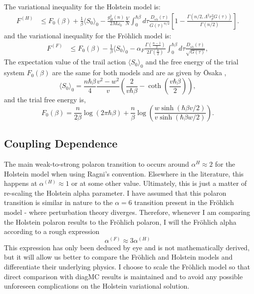 The variational inequality for the Holstein model is:
\begin{equation}
    \begin{aligned}
        F^{(H)} &\leq F_0(\beta) + \frac{1}{\beta} \langle S_0 \rangle_0 - \frac{g_H^2(n)}{2M\omega_0} \frac{V}{N} \int_0^{\hbar\beta} d\tau \frac{D_{\omega_0}(\tau)}{G(\tau)^{n/2}} \left[1 - \frac{\Gamma(n/2, \Lambda^2 r_p^2 G(\tau))}{\Gamma(n/2)}\right].
    \end{aligned}
\end{equation}
and the variational inequality for the Fr\"ohlich model is:
\begin{equation}
    \begin{aligned}
        F^{(F)} &\leq F_0(\beta) -\frac{1}{\beta} \langle S_0 \rangle_0 - \alpha_F \frac{\Gamma\left(\frac{n-1}{2}\right)}{2 \Gamma(\frac{n}{2})} \int_0^{\hbar\beta} d\tau \frac{D_{\omega_0}(\tau)}{\sqrt{G(\tau)}} ,
    \end{aligned}
\end{equation}
The expectation value of the trail action $\langle S_0 \rangle_0$ and the free energy of the trial system $F_0(\beta) $ are the same for both models and are as given by \=Osaka \cite{Osaka1959},
\begin{equation}
    \langle S_0 \rangle_0 = \frac{n\hbar\beta}{4} \frac{v^2-w^2}{v} \left(\frac{2}{v\hbar\beta} - \coth\left(\frac{v\hbar\beta}{2}\right)\right),
\end{equation}
and the trial free energy is,
\begin{equation}
    F_0(\beta) = \frac{n}{2\beta} \log\left(2\pi\hbar\beta\right) + \frac{n}{\beta} \log\left(\frac{w \sinh(\hbar\beta v / 2)}{v \sinh(\hbar\beta w / 2)}\right).
\end{equation}

\subsection{Coupling Dependence}

The main weak-to-strong polaron transition to occurs around $\alpha^{{H}} \approx 2$ for the Holstein model when using Ragni's convention. Elsewhere in the literature, this happens at $\alpha^{(H)} \approx 1$ or at some other value. Ultimately, this is just a matter of re-scaling the Holstein alpha parameter. I have assumed that this polaron transition is similar in nature to the $\alpha = 6$ transition present in the Fr\"ohlich model - where perturbation theory diverges. Therefore, whenever I am comparing the Holstein polaron results to the Fr\"ohlich polaron, I will  the Fr\"ohlich alpha according to a rough expression
\begin{equation}
    \alpha^{(F)} \approx 3 \alpha^{(H)}
\end{equation}
This expression has only been deduced by eye and is not mathematically derived, but it will allow us better to compare the Fr\"ohlich and Holstein models and differentiate their underlying physics. I choose to scale the Fr\"ohlich model so that direct comparison with diagMC results is maintained and to avoid any possible unforeseen complications on the Holstein variational solution.

